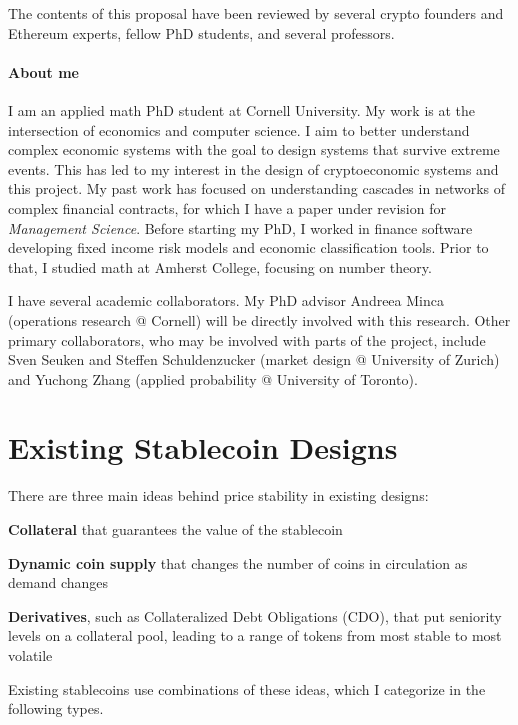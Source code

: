 \documentclass[10pt]{article}
\begin{document}
The contents of this proposal have been reviewed by several crypto founders and Ethereum experts, fellow PhD students, and several professors.



\paragraph{About me}
I am an applied math PhD student at Cornell University. My work is at the intersection of economics and computer science. I aim to better understand complex economic systems with the goal to design systems that survive extreme events. This has led to my interest in the design of cryptoeconomic systems and this project. My past work has focused on understanding cascades in networks of complex financial contracts, for which I have a paper under revision for \emph{Management Science}. Before starting my PhD, I worked in finance software developing fixed income risk models and economic classification tools. Prior to that, I studied math at Amherst College, focusing on number theory.

I have several academic collaborators. My PhD advisor Andreea Minca (operations research @ Cornell) will be directly involved with this research. Other primary collaborators, who may be involved with parts of the project, include Sven Seuken and Steffen Schuldenzucker (market design @ University of Zurich) and Yuchong Zhang (applied probability @ University of Toronto).











\section{Existing Stablecoin Designs}\label{sec:existing_designs}


There are three main ideas behind price stability in existing designs:
\begin{compactitem}
	\item \textbf{Collateral} that guarantees the value of the stablecoin
	
	\item \textbf{Dynamic coin supply} that changes the number of coins in circulation as demand changes
	
	\item \textbf{Derivatives}, such as Collateralized Debt Obligations (CDO), that put seniority levels on a collateral pool, leading to a range of tokens from most stable to most volatile
\end{compactitem}
Existing stablecoins use combinations of these ideas, which I categorize in the following types.
\end{document}
